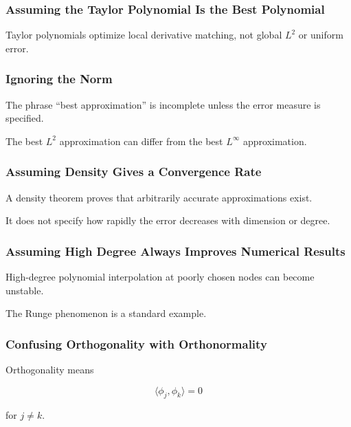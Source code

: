 \subsubsection{Assuming the Taylor Polynomial Is the Best Polynomial}

Taylor polynomials optimize local derivative matching, not global
\(L^2\) or uniform error.

\subsubsection{Ignoring the Norm}

The phrase ``best approximation'' is incomplete unless the error measure
is specified.

The best \(L^2\) approximation can differ from the best \(L^\infty\)
approximation.

\subsubsection{Assuming Density Gives a Convergence Rate}

A density theorem proves that arbitrarily accurate approximations exist.

It does not specify how rapidly the error decreases with dimension or
degree.

\subsubsection{Assuming High Degree Always Improves Numerical Results}

High-degree polynomial interpolation at poorly chosen nodes can become
unstable.

The Runge phenomenon is a standard example.

\subsubsection{Confusing Orthogonality with Orthonormality}

Orthogonality means

\[
\langle\phi_j,\phi_k\rangle=0
\]

for \(j\neq k\).

